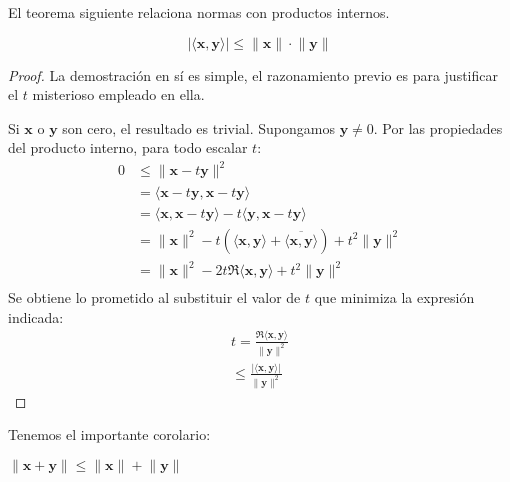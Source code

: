  El teorema siguiente relaciona normas con productos internos.
  \begin{theorem}
    \label{theo:Cauchy-Schwartz}
    \begin{equation*}
      \lvert \langle \mathbf{x}, \mathbf{y} \rangle \lvert
        \le \lVert \mathbf{x} \rVert \cdot \lVert \mathbf{y} \rVert
    \end{equation*}
  \end{theorem}
  \begin{proof}
    La demostración en sí es simple,
    el razonamiento previo
    es para justificar el \(t\) misterioso empleado en ella.

    Si \(\mathbf{x}\) o \(\mathbf{y}\) son cero,
    el resultado es trivial.
    Supongamos \(\mathbf{y} \ne 0\).
    Por las propiedades del producto interno,
    para todo escalar \(t\):
    \begin{align*}
      0
        &\le \lVert \mathbf{x} - t \mathbf{y} \rVert^2 \\
        &=   \langle \mathbf{x} - t \mathbf{y},
                     \mathbf{x} - t \mathbf{y} \rangle \\
        &=   \langle \mathbf{x}, \mathbf{x} - t \mathbf{y} \rangle
                - t \langle \mathbf{y}, \mathbf{x} - t \mathbf{y} \rangle \\
        &=   \lVert \mathbf{x} \rVert^2
                - t \left(
                      \langle \mathbf{x}, \mathbf{y} \rangle
                        + \overline{\langle \mathbf{x}, \mathbf{y} \rangle}
                    \right)
                + t^2 \lVert \mathbf{y} \rVert^2 \\
        &=   \lVert \mathbf{x} \rVert^2
                - 2 t \Re \langle \mathbf{x}, \mathbf{y} \rangle
                + t^2 \lVert \mathbf{y} \rVert^2 \\
    \end{align*}
    Se obtiene lo prometido al substituir el valor de \(t\)
    que minimiza la expresión indicada:
    \begin{align*}
      t
        =   \frac{\Re \langle \mathbf{x}, \mathbf{y} \rangle}
                 {\lVert \mathbf{y} \rVert^2} \\
        \le \frac{\lvert \langle \mathbf{x}, \mathbf{y} \rangle \rvert}
                 {\lVert \mathbf{y} \rVert^2}
    \end{align*}
    \qedhere
  \end{proof}
  Tenemos el importante corolario:
  \begin{corollary}
    \label{cor:desigualdad-triangular}
    \(\lVert \mathbf{x} + \mathbf{y} \rVert
        \le \lVert \mathbf{x} \rVert + \lVert \mathbf{y} \rVert\)
  \end{corollary}
